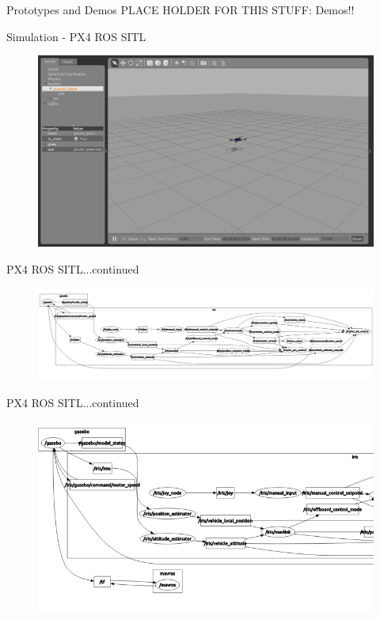 \documentclass[11pt]{beamer}
\begin{document}
\begin{frame}{Prototypes and Demos}
PLACE HOLDER FOR THIS STUFF:
Demos!!
\end{frame}




\begin{frame}{Simulation - PX4 ROS SITL}
\begin{figure}
\includegraphics[width=1\textwidth]{images/flight1}
\end{figure}
\end{frame}

\begin{frame}{PX4 ROS SITL...continued}
\begin{figure}
\includegraphics[width=1\textwidth]{images/px4graph}
\end{figure}
\end{frame}

\begin{frame}{PX4 ROS SITL...continued}
\begin{figure}
\includegraphics[width=1\textwidth]{images/mavros_sitl}
\end{figure}
\end{frame}
\end{document}
